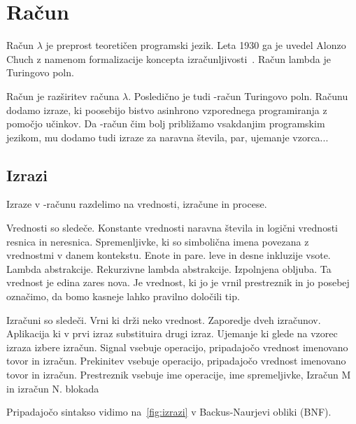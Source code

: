 \section{Račun \lae{}}\label{sec:lae}

Račun $\lambda$ je preprost teoretičen programski jezik. Leta 1930 ga je uvedel Alonzo Chuch z namenom formalizacije koncepta izračunljivosti~\cite{rojas2015tutorial}. Račun lambda je Turingovo poln.


Račun \lae{} je razširitev računa $\lambda$. Posledično je tudi \lae{}-račun Turingovo poln. Računu \lae{} dodamo izraze, ki poosebijo bistvo asinhrono vzporednega programiranja z pomočjo učinkov. Da \lae{}-račun čim bolj približamo vsakdanjim programskim jezikom, mu dodamo tudi izraze za  naravna števila, par, ujemanje vzorca...


\subsection{Izrazi}

Izraze v \lae{}-računu razdelimo na vrednosti, izračune in procese. 


Vrednosti so sledeče.
Konstante vrednosti naravna števila in logični vrednosti resnica in neresnica.
Spremenljivke, ki so simbolična imena povezana z vrednostmi v danem kontekstu.
Enote in pare.
leve in desne inkluzije vsote.
Lambda abstrakcije.
Rekurzivne lambda abstrakcije.
Izpolnjena obljuba. Ta vrednost je edina zares nova. Je vrednost, ki jo je vrnil prestreznik in jo posebej označimo, da bomo kasneje lahko pravilno določili tip.


Izračuni so sledeči.
Vrni ki drži neko vrednost.
Zaporedje dveh izračunov.
Aplikacija ki v prvi izraz substituira drugi izraz.
Ujemanje ki glede na vzorec izraza izbere izračun. 
Signal vsebuje operacijo, pripadajočo vrednost imenovano tovor in izračun.
Prekinitev vsebuje operacijo, pripadajočo vrednost imenovano tovor in izračun.
Prestreznik vsebuje ime operacije, ime spremeljivke, Izračun M in izračun N.
blokada


Pripadajočo sintakso vidimo na~\ref{fig:izrazi} v Backus-Naurjevi obliki (BNF).




